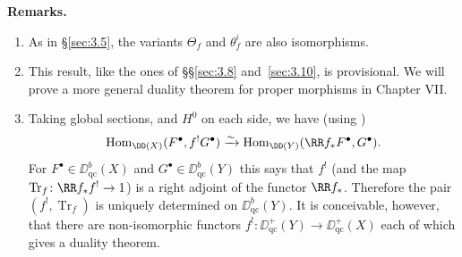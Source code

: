 \textbf{Remarks.}
\begin{enumerate}
\item As in \S\ref{sec:3.5}, the variants $\Theta_f$ and $\theta_f^i$ are also isomorphisms.
\item This result, like the ones of \S\S\ref{sec:3.8} and~\ref{sec:3.10}, is provisional. We will prove a more general duality theorem for proper morphisms in Chapter VII.
\item Taking global sections, and $H^0$ on each side, we have (using )
\[
\operatorname{Hom}_{\DD(X)}(F^\bullet,f^!G^\bullet) \xrightarrow{\sim} \operatorname{Hom}_{\DD(Y)}(\RR f_*F^\bullet,G^\bullet).
\]
For $F^\bullet\in\DD_{\mathrm{qc}}^b(X)$ and $G^\bullet\in\DD_{\mathrm{qc}}^b(Y)$ this says that $f^!$ (and the map $\operatorname{Tr}_f\colon \RR f_* f^!\to 1$) is a right adjoint of the functor $\RR f_*$. Therefore the pair $(f^!,\operatorname{Tr}_f)$ is uniquely determined on $\DD_{\mathrm{qc}}^b(Y)$. It is conceivable, however, that there are non-isomorphic functors $f^!\colon\DD_{\mathrm{qc}}^+(Y)\to\DD_{\mathrm{qc}}^+(X)$ each of which gives a duality theorem.
\end{enumerate}


